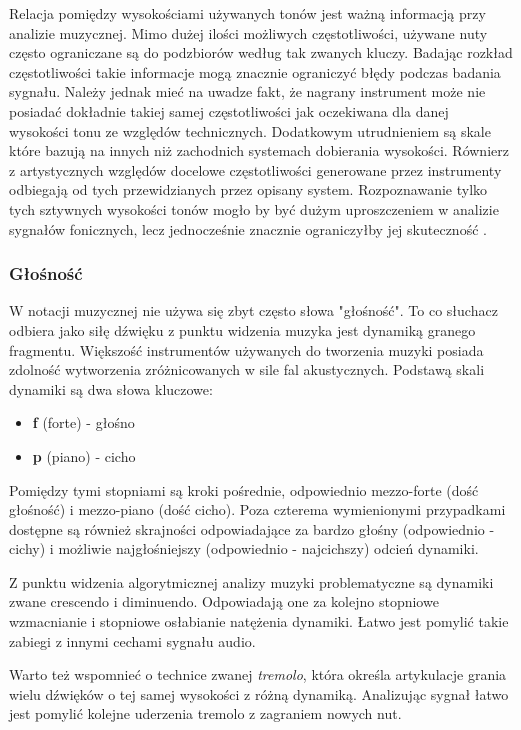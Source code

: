 \documentclass[12pt,a4paper,twoside]{mwart}
\begin{document}
Relacja pomiędzy wysokościami używanych tonów jest ważną informacją przy analizie muzycznej. Mimo dużej ilości możliwych częstotliwości, używane nuty często ograniczane są do podzbiorów według tak zwanych kluczy. Badając rozkład częstotliwości takie informacje mogą znacznie ograniczyć błędy podczas badania sygnału. Należy jednak mieć na uwadze fakt, że nagrany instrument może nie posiadać dokładnie takiej samej częstotliwości jak oczekiwana dla danej wysokości tonu ze względów technicznych. Dodatkowym utrudnieniem są skale które bazują na innych niż zachodnich systemach dobierania wysokości. Równierz z artystycznych względów docelowe częstotliwości generowane przez instrumenty odbiegają od tych przewidzianych przez opisany system. Rozpoznawanie tylko tych sztywnych wysokości tonów mogło by być dużym uproszczeniem w analizie sygnałów fonicznych, lecz jednocześnie znacznie ograniczyłby jej skuteczność \cite[64-65]{Homerecording:DlaKazdego}.

\subsubsection{Głośność}
W notacji muzycznej nie używa się zbyt często słowa "głośność". To co słuchacz odbiera jako siłę dźwięku z punktu widzenia muzyka jest dynamiką granego fragmentu. Większość instrumentów używanych do tworzenia muzyki posiada zdolność wytworzenia zróżnicowanych w sile fal akustycznych. Podstawą skali dynamiki są dwa słowa kluczowe:

\begin{itemize}
  \item \textbf{f} (forte) - głośno
  \item \textbf{p} (piano) - cicho
\end{itemize}

Pomiędzy tymi stopniami są kroki pośrednie, odpowiednio mezzo-forte (dość głośność) i mezzo-piano (dość cicho). Poza czterema wymienionymi przypadkami dostępne są również skrajności odpowiadające za bardzo głośny (odpowiednio - cichy) i możliwie najgłośniejszy (odpowiednio - najcichszy) odcień dynamiki. 

Z punktu widzenia algorytmicznej analizy muzyki problematyczne są dynamiki zwane crescendo i diminuendo. Odpowiadają one za kolejno stopniowe wzmacnianie i stopniowe osłabianie natężenia dynamiki. Łatwo jest pomylić takie zabiegi z innymi cechami sygnału audio.

Warto też wspomnieć o technice zwanej \textit{tremolo}, która określa artykulacje  grania wielu dźwięków o tej samej wysokości z różną dynamiką. Analizując sygnał łatwo jest pomylić kolejne uderzenia tremolo z zagraniem nowych nut.
\end{document}
